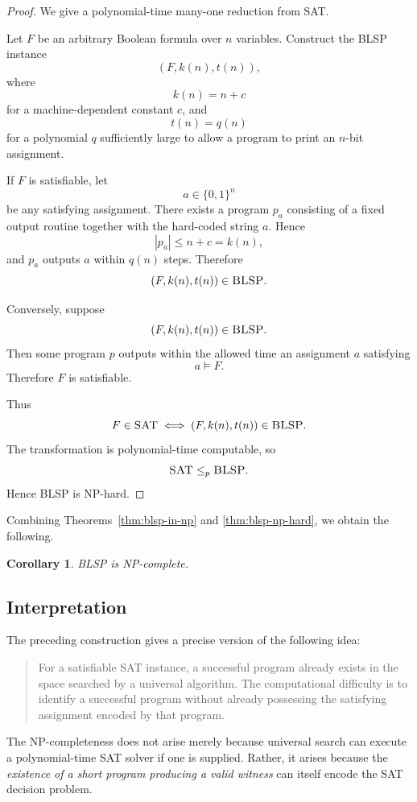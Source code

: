 \documentclass[11pt]{article}
\theoremstyle{plain}
\newtheorem{corollary}[theorem]{Corollary}
\theoremstyle{definition}
\begin{document}
\begin{proof}
We give a polynomial-time many-one reduction from \textsc{SAT}.

Let \(F\) be an arbitrary Boolean formula over \(n\) variables.  Construct the
\textsc{BLSP} instance
\[
    (F,k(n),t(n)),
\]
where
\[
    k(n)=n+c
\]
for a machine-dependent constant \(c\), and
\[
    t(n)=q(n)
\]
for a polynomial \(q\) sufficiently large to allow a program to print an
\(n\)-bit assignment.

If \(F\) is satisfiable, let
\[
    a\in\{0,1\}^{n}
\]
be any satisfying assignment.  There exists a program \(p_a\) consisting of
a fixed output routine together with the hard-coded string \(a\).  Hence
\[
    |p_a|\leq n+c=k(n),
\]
and \(p_a\) outputs \(a\) within \(q(n)\) steps.  Therefore
\[
    (F,k(n),t(n))\in\textsc{BLSP}.
\]

Conversely, suppose
\[
    (F,k(n),t(n))\in\textsc{BLSP}.
\]
Then some program \(p\) outputs within the allowed time an assignment \(a\)
satisfying
\[
    a\models F.
\]
Therefore \(F\) is satisfiable.

Thus
\[
    F\in\textsc{SAT}
    \iff
    (F,k(n),t(n))\in\textsc{BLSP}.
\]
The transformation is polynomial-time computable, so
\[
    \textsc{SAT}\leq_p\textsc{BLSP}.
\]
Hence \textsc{BLSP} is NP-hard.
\end{proof}

Combining Theorems~\ref{thm:blsp-in-np} and
\ref{thm:blsp-np-hard}, we obtain the following.

\begin{corollary}
\label{cor:blsp-np-complete}
\textsc{BLSP} is NP-complete.
\end{corollary}

\subsection{Interpretation}

The preceding construction gives a precise version of the following idea:

\begin{quote}
For a satisfiable SAT instance, a successful program already exists in the
space searched by a universal algorithm.  The computational difficulty is to
identify a successful program without already possessing the satisfying
assignment encoded by that program.
\end{quote}

The NP-completeness does not arise merely because universal search can execute
a polynomial-time SAT solver if one is supplied.  Rather, it arises because
the \emph{existence of a short program producing a valid witness} can itself
encode the SAT decision problem.
\end{document}
